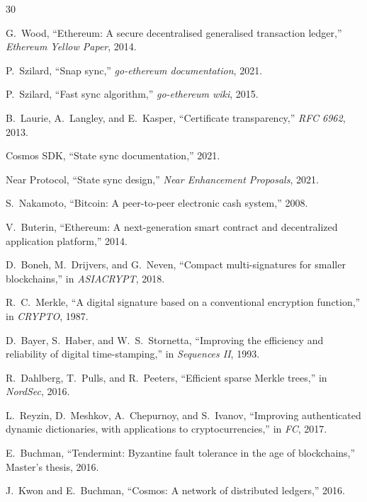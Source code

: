 
\begin{thebibliography}{30}

G.~Wood, ``Ethereum: A secure decentralised generalised transaction ledger,'' \emph{Ethereum Yellow Paper}, 2014.

P.~Szilard, ``Snap sync,'' \emph{go-ethereum documentation}, 2021.

P.~Szilard, ``Fast sync algorithm,'' \emph{go-ethereum wiki}, 2015.

B.~Laurie, A.~Langley, and E.~Kasper, ``Certificate transparency,'' \emph{RFC 6962}, 2013.

Cosmos SDK, ``State sync documentation,'' 2021.

Near Protocol, ``State sync design,'' \emph{Near Enhancement Proposals}, 2021.

S.~Nakamoto, ``Bitcoin: A peer-to-peer electronic cash system,'' 2008.

V.~Buterin, ``Ethereum: A next-generation smart contract and decentralized application platform,'' 2014.

D.~Boneh, M.~Drijvers, and G.~Neven, ``Compact multi-signatures for smaller blockchains,'' in \emph{ASIACRYPT}, 2018.

R.~C.~Merkle, ``A digital signature based on a conventional encryption function,'' in \emph{CRYPTO}, 1987.

D.~Bayer, S.~Haber, and W.~S.~Stornetta, ``Improving the efficiency and reliability of digital time-stamping,'' in \emph{Sequences II}, 1993.

R.~Dahlberg, T.~Pulls, and R.~Peeters, ``Efficient sparse Merkle trees,'' in \emph{NordSec}, 2016.

L.~Reyzin, D.~Meshkov, A.~Chepurnoy, and S.~Ivanov, ``Improving authenticated dynamic dictionaries, with applications to cryptocurrencies,'' in \emph{FC}, 2017.

E.~Buchman, ``Tendermint: Byzantine fault tolerance in the age of blockchains,'' Master's thesis, 2016.

J.~Kwon and E.~Buchman, ``Cosmos: A network of distributed ledgers,'' 2016.


\end{thebibliography}
